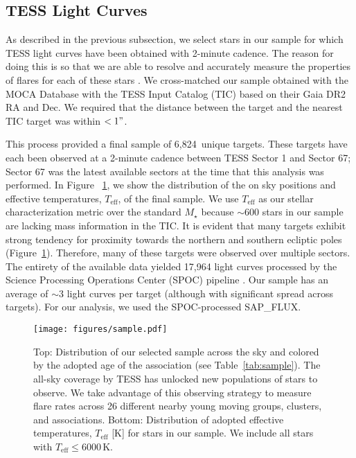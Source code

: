 \documentclass[twocolumn]{aastex631}
\newcommand{\nstars}{6,824}
\begin{document}
\subsection{TESS Light Curves}\label{subsec2:TESS_lightcurve}

As described in the previous subsection, we select stars in our sample for which TESS light curves have been obtained with 2-minute cadence. The reason for doing this is so that we are able to resolve and accurately measure the properties of flares for each of these stars \citep{howard22}. We cross-matched our sample obtained with the MOCA Database with the TESS Input Catalog (TIC) based on their Gaia DR2 RA and Dec. We required that the distance between the target and the nearest TIC target was within $<1"$.

This process provided a final sample of \nstars\ unique targets. These targets have each been observed at a 2-minute cadence between TESS Sector 1 and Sector 67; Sector 67 was the latest available sectors at the time that this analysis was performed. In Figure ~\ref{fig:sample}, we show the distribution of the on sky positions and effective temperatures, $T_\textrm{eff}$, of the final sample. We use $T_\textrm{eff}$ as our stellar characterization metric over the standard $M_\star$ because $\sim 600$ stars in our sample are lacking mass information in the TIC.  It is evident that  many targets exhibit strong tendency for proximity towards the
northern and southern ecliptic poles (Figure~\ref{fig:sample}). Therefore, many of these targets were observed
over multiple sectors. The entirety of the available data yielded 17,964 light curves processed by the Science Processing Operations Center (SPOC) pipeline \citep{jenkins16}. Our sample has an average of $\sim 3$ light curves per target (although with significant spread across targets). For our analysis, we used the SPOC-processed SAP\_FLUX.

\begin{figure}[ht!]
    \begin{centering}
        \texttt{[image: figures/sample.pdf]}
        \caption{
            Top: Distribution of our selected sample across the sky and colored by the adopted age of the association (see Table~\ref{tab:sample}). The all-sky coverage by TESS has unlocked new populations of stars to observe. We take advantage of this observing strategy to measure flare rates across 26 different nearby young moving groups, clusters, and associations. Bottom: Distribution of adopted effective temperatures, $T_\textrm{eff}$ [K] for stars in our sample. We include all stars with $T_\textrm{eff} \leq 6000$\,K.
        }
        \label{fig:sample}
    \end{centering}
\end{figure}
\end{document}
